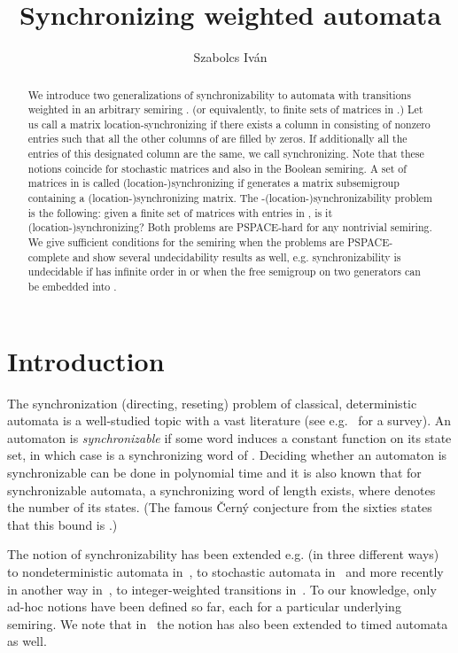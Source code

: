 \documentclass[submission,copyright,creativecommons]{eptcs}
\title{Synchronizing weighted automata}
\author{Szabolcs Iv\'an
\institute{University of Szeged, Hungary}
\email{szabivan@inf.u-szeged.hu}
}
\theoremstyle{plain}
\theoremstyle{definition}
\theoremstyle{remark}
\begin{document}
\maketitle

\begin{abstract}
We introduce two generalizations of synchronizability to automata with transitions weighted in an arbitrary semiring .
(or equivalently, to finite sets of matrices in .)
Let us call a matrix  location-synchronizing if there exists a column in  consisting of nonzero entries such that all the other columns of  are filled by zeros.
If additionally all the entries of this designated column are the same, we call  synchronizing.
Note that these notions coincide for stochastic matrices and also in the Boolean semiring.
A set  of matrices in  is called (location-)synchronizing if  generates a matrix subsemigroup containing a (location-)synchronizing matrix.
The -(location-)synchronizability problem is the following: given a finite set  of  matrices with entries in ,
is it (location-)synchronizing? 
Both problems are PSPACE-hard for any nontrivial semiring.
We give sufficient conditions for the semiring  when the problems are PSPACE-complete and show several undecidability results as well, e.g. synchronizability is undecidable if  has infinite order in  or when the free semigroup on two generators can be embedded into .
\end{abstract}

\section{Introduction}

The synchronization (directing, reseting) problem of classical, deterministic automata is a well-studied topic with a vast literature (see e.g.~\cite{volkov} for a survey). An automaton  is \emph{synchronizable} if some word  induces a constant function on its state set, in which case  is a synchronizing word of .
Deciding whether an automaton is synchronizable can be done in polynomial time and it is also known that for synchronizable automata, a synchronizing word of length  exists, where  denotes the number of its states.
(The famous \v{C}ern\'y conjecture from the sixties states that this bound is .)

The notion of synchronizability has been extended e.g. (in three different ways) to nondeterministic automata in~\cite{imreh}, to stochastic automata in~\cite{kfouri} and more recently in another way in~\cite{doyen}, to integer-weighted transitions in~\cite{larsen}.
To our knowledge, only ad-hoc notions have been defined so far, each for a particular underlying semiring.
We note that in~\cite{larsen} the notion has also been extended to timed automata as well.
\end{document}
